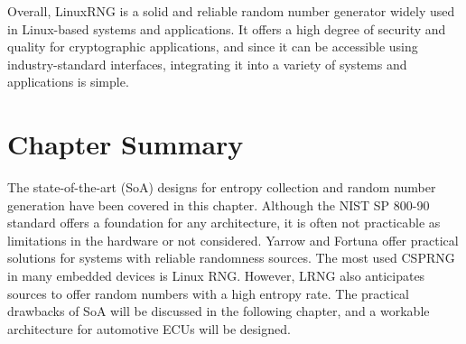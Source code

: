 Overall, LinuxRNG is a solid and reliable random number generator widely used in Linux-based systems and applications. It offers a high degree of security and quality for cryptographic applications, and since it can be accessible using industry-standard interfaces, integrating it into a variety of systems and applications is simple.


%
%
\section{Chapter Summary}
\label{sec:SoA:Summary}
The state-of-the-art (SoA) designs for entropy collection and random number generation have been covered in this chapter. Although the NIST SP 800-90 standard offers a foundation for any architecture, it is often not practicable as limitations in the hardware or not considered. Yarrow and Fortuna offer practical solutions for systems with reliable randomness sources. The most used CSPRNG in many embedded devices is Linux RNG. However, LRNG also anticipates sources to offer random numbers with a high entropy rate. The practical drawbacks of SoA will be discussed in the following chapter, and a workable architecture for automotive ECUs will be designed.
